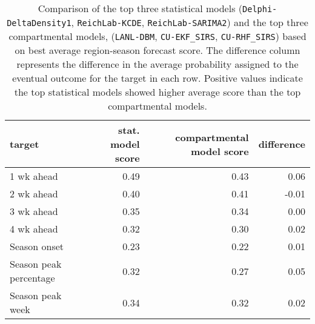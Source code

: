 \begin{table}[ht]
\centering
\begin{tabular}{lrrr}
  \hline
target & stat. model score & compartmental model score & difference \\ 
  \hline
1 wk ahead & 0.49 & 0.43 & 0.06 \\ 
  2 wk ahead & 0.40 & 0.41 & -0.01 \\ 
  3 wk ahead & 0.35 & 0.34 & 0.00 \\ 
  4 wk ahead & 0.32 & 0.30 & 0.02 \\ 
  Season onset & 0.23 & 0.22 & 0.01 \\ 
  Season peak percentage & 0.32 & 0.27 & 0.05 \\ 
  Season peak week & 0.34 & 0.32 & 0.02 \\ 
   \hline
\end{tabular}
\caption{Comparison of the top three statistical models ({\tt Delphi-DeltaDensity1}, {\tt ReichLab-KCDE}, {\tt ReichLab-SARIMA2}) and the top three compartmental models, ({\tt LANL-DBM}, {\tt CU-EKF\_SIRS}, {\tt CU-RHF\_SIRS}) based on best average region-season forecast score. The difference column represents the difference in the average probability assigned to the eventual outcome for the target in each row. Positive values indicate the top statistical models showed higher average score than the top compartmental models.} 
\label{tab:score-by-model-type}
\end{table}
